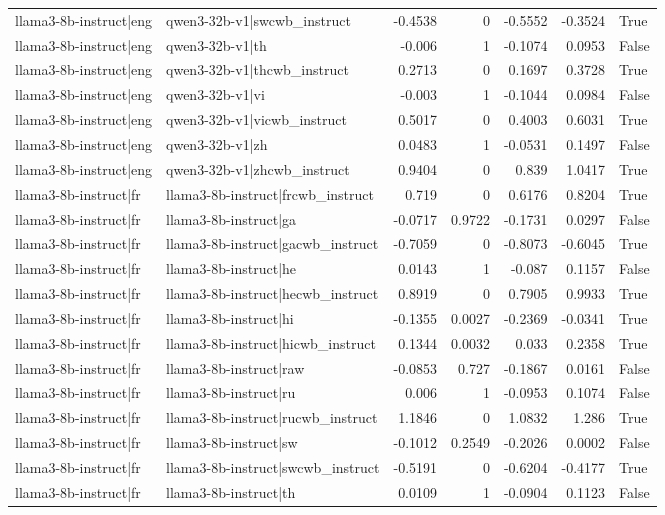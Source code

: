 \begin{table}
\begin{tabular}{l l r r r r l}
llama3-8b-instruct|eng & qwen3-32b-v1|swcwb_instruct & -0.4538 & 0 & -0.5552 & -0.3524 & True \\
llama3-8b-instruct|eng & qwen3-32b-v1|th & -0.006 & 1 & -0.1074 & 0.0953 & False \\
llama3-8b-instruct|eng & qwen3-32b-v1|thcwb_instruct & 0.2713 & 0 & 0.1697 & 0.3728 & True \\
llama3-8b-instruct|eng & qwen3-32b-v1|vi & -0.003 & 1 & -0.1044 & 0.0984 & False \\
llama3-8b-instruct|eng & qwen3-32b-v1|vicwb_instruct & 0.5017 & 0 & 0.4003 & 0.6031 & True \\
llama3-8b-instruct|eng & qwen3-32b-v1|zh & 0.0483 & 1 & -0.0531 & 0.1497 & False \\
llama3-8b-instruct|eng & qwen3-32b-v1|zhcwb_instruct & 0.9404 & 0 & 0.839 & 1.0417 & True \\
llama3-8b-instruct|fr & llama3-8b-instruct|frcwb_instruct & 0.719 & 0 & 0.6176 & 0.8204 & True \\
llama3-8b-instruct|fr & llama3-8b-instruct|ga & -0.0717 & 0.9722 & -0.1731 & 0.0297 & False \\
llama3-8b-instruct|fr & llama3-8b-instruct|gacwb_instruct & -0.7059 & 0 & -0.8073 & -0.6045 & True \\
llama3-8b-instruct|fr & llama3-8b-instruct|he & 0.0143 & 1 & -0.087 & 0.1157 & False \\
llama3-8b-instruct|fr & llama3-8b-instruct|hecwb_instruct & 0.8919 & 0 & 0.7905 & 0.9933 & True \\
llama3-8b-instruct|fr & llama3-8b-instruct|hi & -0.1355 & 0.0027 & -0.2369 & -0.0341 & True \\
llama3-8b-instruct|fr & llama3-8b-instruct|hicwb_instruct & 0.1344 & 0.0032 & 0.033 & 0.2358 & True \\
llama3-8b-instruct|fr & llama3-8b-instruct|raw & -0.0853 & 0.727 & -0.1867 & 0.0161 & False \\
llama3-8b-instruct|fr & llama3-8b-instruct|ru & 0.006 & 1 & -0.0953 & 0.1074 & False \\
llama3-8b-instruct|fr & llama3-8b-instruct|rucwb_instruct & 1.1846 & 0 & 1.0832 & 1.286 & True \\
llama3-8b-instruct|fr & llama3-8b-instruct|sw & -0.1012 & 0.2549 & -0.2026 & 0.0002 & False \\
llama3-8b-instruct|fr & llama3-8b-instruct|swcwb_instruct & -0.5191 & 0 & -0.6204 & -0.4177 & True \\
llama3-8b-instruct|fr & llama3-8b-instruct|th & 0.0109 & 1 & -0.0904 & 0.1123 & False \\

\end{tabular}
\end{table}
